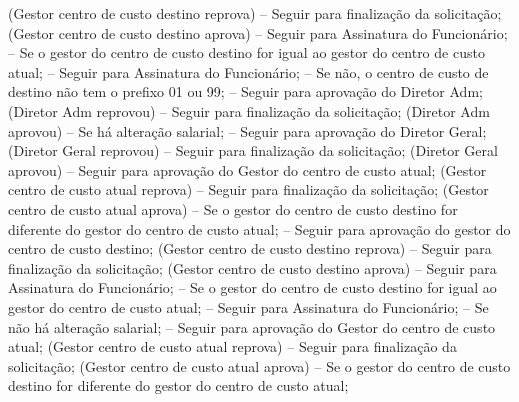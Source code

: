                                  (Gestor centro de custo destino reprova)
                                    -- Seguir para finalização da solicitação;
                                 (Gestor centro de custo destino aprova)
                                    -- Seguir para Assinatura do Funcionário;
                           -- Se o gestor do centro de custo destino for igual ao gestor do centro de custo atual;
                              -- Seguir para Assinatura do Funcionário;
            -- Se não, o centro de custo de destino não tem o prefixo 01 ou 99;
               -- Seguir para aprovação do Diretor Adm;
                  (Diretor Adm reprovou)
                     -- Seguir para finalização da solicitação;
                  (Diretor Adm aprovou)
                     -- Se há alteração salarial;
                        -- Seguir para aprovação do Diretor Geral;
                           (Diretor Geral reprovou)
                              -- Seguir para finalização da solicitação;
                           (Diretor Geral aprovou)
                              -- Seguir para aprovação do Gestor do centro de custo atual;
                                 (Gestor centro de custo atual reprova)
                                    -- Seguir para finalização da solicitação;
                                 (Gestor centro de custo atual aprova)
                                    -- Se o gestor do centro de custo destino for diferente do gestor do centro de custo atual;
                                       -- Seguir para aprovação do gestor do centro de custo destino;
                                          (Gestor centro de custo destino reprova)
                                             -- Seguir para finalização da solicitação;
                                          (Gestor centro de custo destino aprova)
                                             -- Seguir para Assinatura do Funcionário;
                                    -- Se o gestor do centro de custo destino for igual ao gestor do centro de custo atual;
                                       -- Seguir para Assinatura do Funcionário;
                     -- Se não há alteração salarial;
                        -- Seguir para aprovação do Gestor do centro de custo atual;
                           (Gestor centro de custo atual reprova)
                              -- Seguir para finalização da solicitação;
                           (Gestor centro de custo atual aprova)
                              -- Se o gestor do centro de custo destino for diferente do gestor do centro de custo atual;
